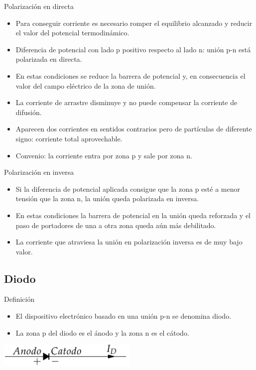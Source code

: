 \documentclass[xcolor={usenames,svgnames,dvipsnames}]{beamer}
\begin{document}
\begin{frame}[label=sec-1-4-4]{Polarización en directa}
\begin{itemize}
\item \alert{Para conseguir corriente es necesario romper el equilibrio alcanzado y reducir el valor del potencial termodinámico}.

\item \alert{Diferencia de potencial} con lado p positivo respecto al lado n: unión p-n está \alert{polarizada en directa}.

\item En estas condiciones \alert{se reduce la barrera de potencial} y, en consecuencia el valor del campo eléctrico de la zona de unión.

\item La \alert{corriente de arrastre disminuye} y \alert{no puede compensar la corriente de difusión}.

\item Aparecen dos corrientes en sentidos contrarios pero de partículas de diferente signo: \alert{corriente total aprovechable.}

\item Convenio: la corriente entra por zona p y sale por zona n.
\end{itemize}
\end{frame}

\begin{frame}[label=sec-1-4-5]{Polarización en inversa}
\begin{itemize}
\item Si la diferencia de potencial aplicada consigue que la zona p esté a
menor tensión que la zona n, la unión queda \alert{polarizada en inversa}.

\item En estas condiciones \alert{la barrera de potencial en la unión queda
reforzada} y el paso de portadores de una a otra zona queda aún más
debilitado.

\item La \alert{corriente que atraviesa la unión en polarización inversa es de muy bajo valor}.
\end{itemize}
\end{frame}

\subsection{Diodo}
\label{sec-1-5}

\begin{frame}[label=sec-1-5-1]{Definición}
\begin{itemize}
\item El dispositivo electrónico basado en una unión p-n se denomina diodo.

\item La zona p del diodo es el ánodo y la zona n es el cátodo.
\end{itemize}
\includegraphics[width=0.5\textwidth]{../figs/Diodo.pdf}
\end{frame}
\end{document}
